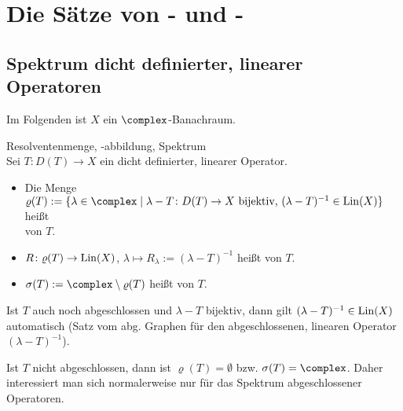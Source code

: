 \chapter{%
    Die Sätze von - und -%
}

\section{%
    Spektrum dicht definierter, linearer Operatoren%
}

\begin{Bem}
    Im Folgenden ist $X$ ein $\complex$-Banachraum.
\end{Bem}

\begin{Def}{Resolventenmenge, -abbildung, Spektrum}\\
    Sei $T\colon D(T) \rightarrow X$ ein dicht definierter, linearer Operator.
    \begin{itemize}
        \item
        Die Menge $\varrho(T) := \{\lambda \in \complex \;|\;
        \text{$\lambda-T\colon D(T) \rightarrow X$ bijektiv, $(\lambda-T)^{-1} \in \Lin(X)$}\}$
        heißt\\
         von $T$.

        \item
        $R\colon \varrho(T) \rightarrow \operatorname{Lin}(X)$, $\lambda \mapsto R_\lambda := (\lambda-T)^{-1}$
        heißt  von $T$.

        \item
        $\sigma(T) := \complex \setminus \varrho(T)$ heißt  von $T$.
    \end{itemize}
\end{Def}

\begin{Bem}
    Ist $T$ auch noch abgeschlossen und $\lambda - T$ bijektiv, dann gilt
    $(\lambda-T)^{-1} \in \operatorname{Lin}(X)$ automatisch
    (Satz vom abg. Graphen für den abgeschlossenen,
    linearen Operator $(\lambda - T)^{-1}$).
\end{Bem}

\begin{Bem}
    Ist $T$ nicht abgeschlossen, dann ist $\varrho(T) = \emptyset$ bzw. $\sigma(T) = \complex$.
    Daher interessiert man sich normalerweise nur für das Spektrum abgeschlossener Operatoren.
\end{Bem}

